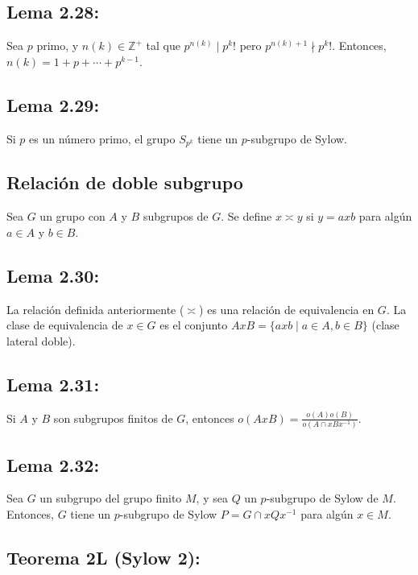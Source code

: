 \documentclass{article}
\begin{document}
\subsection*{\color{blue} Lema 2.28:}

Sea $p$ primo, y $n(k)\in\mathbb{Z}^+$ tal que $p^{n(k)}\mid p^k!$ pero $p^{n(k)+1}\nmid p^k!$. Entonces, $n(k)=1+p+\cdots+p^{k-1}$.

\subsection*{\color{blue} Lema 2.29:}

Si $p$ es un número primo, el grupo $S_{p^k}$ tiene un $p$-subgrupo de Sylow.

\subsection*{\color{violet} Relación de doble subgrupo}

Sea $G$ un grupo con $A$ y $B$ subgrupos de $G$. Se define $x\asymp y$ si $y=axb$ para algún $a\in A$ y $b\in B$.

\subsection*{\color{blue} Lema 2.30:}

La relación definida anteriormente ($\asymp$) es una relación de equivalencia en $G$. La clase de equivalencia de $x\in G$ es el conjunto $AxB=\{axb\mid a\in A, b\in B\}$ (clase lateral doble).

\subsection*{\color{blue} Lema 2.31:}

Si $A$ y $B$ son subgrupos finitos de $G$, entonces $o(AxB)=\displaystyle\frac{o(A)o(B)}{o(A\cap xBx^{-1})}.$

\subsection*{\color{blue} Lema 2.32:}

Sea $G$ un subgrupo del grupo finito $M$, y sea $Q$ un $p$-subgrupo de Sylow de $M$. Entonces, $G$ tiene un $p$-subgrupo de Sylow $P=G\cap xQx^{-1}$ para algún $x\in M$.

\subsection*{\color{red} Teorema 2L (Sylow 2):}
\end{document}
